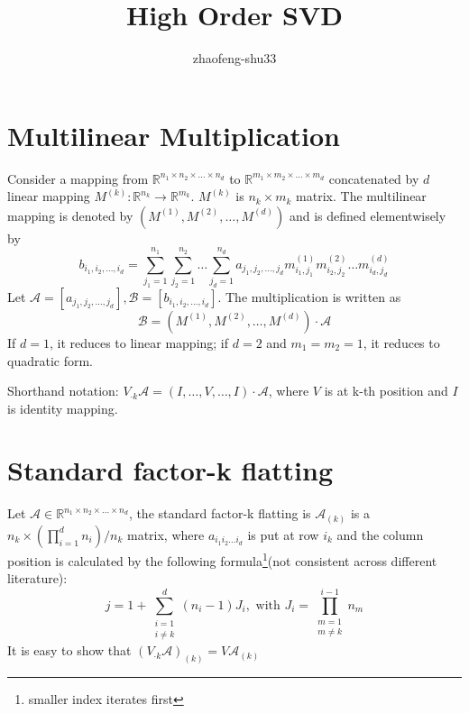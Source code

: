 \documentclass{article}
\def\R{\mathbb{R}}
\begin{document}
\title{High Order SVD}
\author{zhaofeng-shu33}
\maketitle
\section{Multilinear Multiplication}
Consider a mapping from $\R^{n_1 \times n_2 \times \dots \times n_d} $ to 
$\R^{m_1 \times m_2 \times \dots \times m_d} $ concatenated by $d$ linear mapping $M^{(k)}: \R^{n_k} \to \R^{m_k}$.
$M^{(k)}$ is $n_k \times m_k$ matrix.
The multilinear mapping is denoted by $(M^{(1)}, M^{(2)}, \dots, M^{(d)})$ and is defined elementwisely by
\begin{equation}
b_{i_1, i_2, \dots, i_d} = \sum_{j_1=1}^{n_1} \sum_{j_2 = 1}^{n_2} \dots \sum_{j_d = 1}^{n_d} a_{j_1,j_2,\dots,j_d} m^{(1)}_{i_1, j_1}
m^{(2)}_{i_2,j_2}\dots m^{(d)}_{i_d,j_d}
\end{equation}
Let $\mathcal{A} =[a_{j_1,j_2,\dots,j_d}], \mathcal{B}=[b_{i_1, i_2, \dots, i_d}]$. The multiplication is written as 
\begin{equation}
\mathcal{B} = (M^{(1)}, M^{(2)}, \dots, M^{(d)})\cdot\mathcal{A}
\end{equation}
If $d=1$, it reduces to linear mapping; if $d=2$ and $m_1=m_2=1$, it reduces to quadratic form.

Shorthand notation: $V_{\cdot k}\mathcal{A} = (I, \dots, V,\dots, I) \cdot \mathcal{A}$, where $V$ is at k-th position and $I$ is identity mapping.

\section{Standard factor-k flatting}
Let $\mathcal{A} \in \R^{n_1 \times n_2 \times \dots \times n_d}$, the standard factor-k flatting is $\mathcal{A}_{(k)}$ is a $n_k \times (\prod_{i=1}^d n_i)/n_k$ matrix, where $a_{i_1i_2\dots i_d} $ is put at row $i_k$ and the column position is calculated by 
the following formula\footnote{smaller index iterates first}(not consistent across different literature):
\begin{equation}
j = 1 + \sum_{\substack{i=1 \\ i\neq k}}^d (n_i - 1) J_i, \textrm{ with } J_i = \prod_{\substack{m=1\\ m\neq k}}^{i-1} n_m
\end{equation}
It is easy to show that $(V_{\cdot k} \mathcal{A})_{(k)} = V \mathcal{A}_{(k)}$
\end{document}
